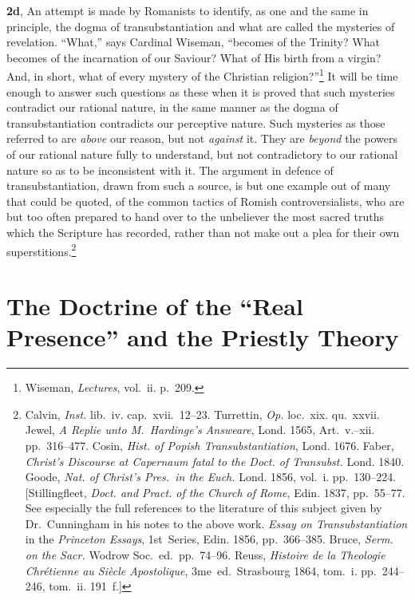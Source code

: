 \documentclass[
]{book}
\begin{document}
\textbf{2d}, An attempt is made by Romanists to identify, as one and the same in principle, the dogma of transubstantiation and what are called the mysteries of revelation. ``What,'' says Cardinal Wiseman, ``becomes of the Trinity? What becomes of the incarnation of our Saviour? What of His birth from a virgin? And, in short, what of every mystery of the Christian religion?''\footnote{Wiseman, \emph{Lectures}, vol.~ii. p.~209.} It will be time enough to answer such questions as these when it is proved that such mysteries contradict our rational nature, in the same manner as the dogma of transubstantiation contradicts our perceptive nature. Such mysteries as those referred to are \emph{above} our reason, but not \emph{against} it. They are \emph{beyond} the powers of our rational nature fully to understand, but not contradictory to our rational nature so as to be inconsistent with it. The argument in defence of transubstantiation, drawn from such a source, is but one example out of many that could be quoted, of the common tactics of Romish controversialists, who are but too often prepared to hand over to the unbeliever the most sacred truths which the Scripture has recorded, rather than not make out a plea for their own superstitions.\footnote{Calvin, \emph{Inst.} lib.~iv. cap.~xvii.~12--23. Turrettin, \emph{Op.} loc.~xix. qu.~xxvii. Jewel, \emph{A Replie unto M.~Hardinge's Answeare}, Lond. 1565, Art.~v.--xii. pp.~316--477. Cosin, \emph{Hist. of Popish Transubstantiation}, Lond. 1676. Faber, \emph{Christ's Discourse at Capernaum fatal to the Doct. of Transubst.} Lond. 1840. Goode, \emph{Nat. of Christ's Pres.~in the Euch.} Lond. 1856, vol.~i. pp.~130--224. {[}Stillingfleet, \emph{Doct. and Pract. of the Church of Rome}, Edin. 1837, pp.~55--77. See especially the full references to the literature of this subject given by Dr.~Cunningham in his notes to the above work. \emph{Essay on Transubstantiation} in the \emph{Princeton Essays}, 1st~Series, Edin. 1856, pp.~366--385. Bruce, \emph{Serm. on the Sacr.} Wodrow Soc.~ed.~pp.~74--96. Reuss, \foreignlanguage{french}{\emph{Histoire de la Theologie Chrétienne au Siècle Apostolique}}, 3me~ed.~Strasbourg 1864, tom.~i. pp.~244--246, tom.~ii. 191~f.{]}}

\hypertarget{the-doctrine-of-the-real-presence-and-the-priestly-theory}{%
\section{The Doctrine of the ``Real Presence'' and the Priestly Theory}\label{the-doctrine-of-the-real-presence-and-the-priestly-theory}}
\end{document}
